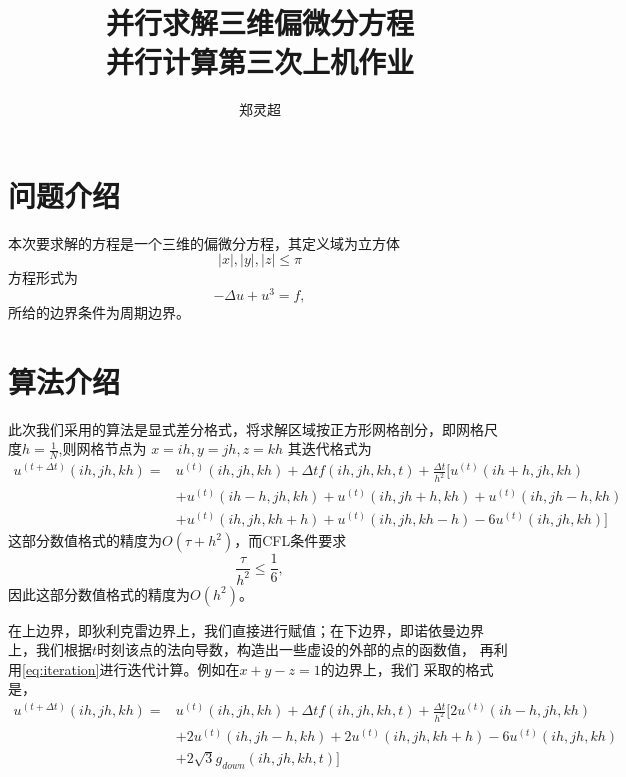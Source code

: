 \documentclass[a4paper,  11pt]{ctexart}
\begin{document}
\title{并行求解三维偏微分方程 \\ 并行计算第三次上机作业}
\author{郑灵超}
\maketitle
\tableofcontents
\newpage
\section{问题介绍}
本次要求解的方程是一个三维的偏微分方程，其定义域为立方体
\[
  |x|,|y|,|z|\leq \pi
\]
方程形式为
\begin{equation}
	\label{eq:PDEequation}
	-\Delta u + u^3 = f ,
\end{equation}
所给的边界条件为周期边界。
\section{算法介绍}

此次我们采用的算法是显式差分格式，将求解区域按正方形网格剖分，即网格尺
度$h=\frac 1 N$,则网格节点为
$x=ih,y=jh,z=kh$
其迭代格式为
\begin{equation}
	\begin{aligned}
		\label{eq:iteration}
	u^{(t+\Delta t)}(ih,jh,kh) =& u^{(t)}(ih,jh,kh) +\Delta t
	f(ih,jh,kh,t) 
	 +\frac{\Delta t}{h^2}[
	u^{(t)}(ih+h,jh,kh)  \\  
	& +u^{(t)}(ih-h,jh,kh) 
 	+u^{(t)}(ih,jh+h,kh)+u^{(t)}(ih,jh-h,kh) \\ 
	& +u^{(t)}(ih,jh,kh+h)+u^{(t)}(ih,jh,kh-h) - 6 u^{(t)}(ih,jh,kh)
	]
\end{aligned}
\end{equation}
这部分数值格式的精度为$O(\tau+h^2)$，而CFL条件要求
$$\frac{\tau}{h^2}\leq \frac{1}{6},$$
因此这部分数值格式的精度为$O(h^2)$。

在上边界，即狄利克雷边界上，我们直接进行赋值；在下边界，即诺依曼边界
上，我们根据$t$时刻该点的法向导数，构造出一些虚设的外部的点的函数值，
再利用\eqref{eq:iteration}进行迭代计算。例如在$x+y-z=1$的边界上，我们
采取的格式是，
\begin{equation}
	\label{eq:neumann}
	\begin{aligned}
	u^{(t+\Delta t)}(ih,jh,kh) =& u^{(t)}(ih,jh,kh) +\Delta t
	f(ih,jh,kh,t) 
	 +\frac{\Delta t}{h^2}[
	  2u^{(t)}(ih-h,jh,kh) \\
 	&+ 2u^{(t)}(ih,jh-h,kh)+2u^{(t)}(ih,jh,kh+h)-6 u^{(t)}(ih,jh,kh)\\
	&+ 2\sqrt{3}g_{down}(ih,jh,kh,t)]
	\end{aligned}
\end{equation}
\end{document}
